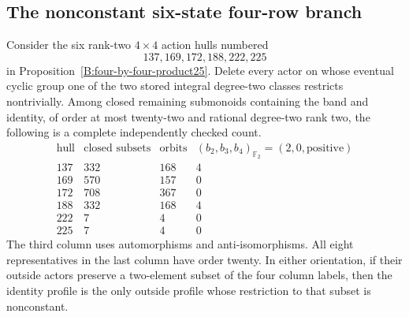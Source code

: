 \subsection{The nonconstant six-state four-row branch}

\begin{lemma}
\label{C:six-rank-two-bounded-hulls}
Consider the six rank-two $4\times4$ action hulls numbered
\[
 137,169,172,188,222,225
\]
in Proposition~\ref{B:four-by-four-product25}.
Delete every actor on whose eventual cyclic group one of the
two stored integral degree-two classes restricts nontrivially.
Among closed remaining submonoids containing the band and identity,
of order at most twenty-two and rational degree-two rank two,
the following is a complete independently checked count.
\[
\begin{array}{c|r|r|r}
\text{hull}&\text{closed subsets}&\text{orbits}&
 (b_2,b_3,b_4)_{\mathbb F_2}=(2,0,\text{positive})\\\hline
137&332&168&4\\
169&570&157&0\\
172&708&367&0\\
188&332&168&4\\
222&7&4&0\\
225&7&4&0
\end{array}
\]
The third column uses automorphisms and anti-isomorphisms.
All eight representatives in the last column have order twenty.
In either orientation, if their outside actors preserve a two-element
subset of the four column labels, then the identity profile is the
only outside profile whose restriction to that subset is nonconstant.
\end{lemma}
